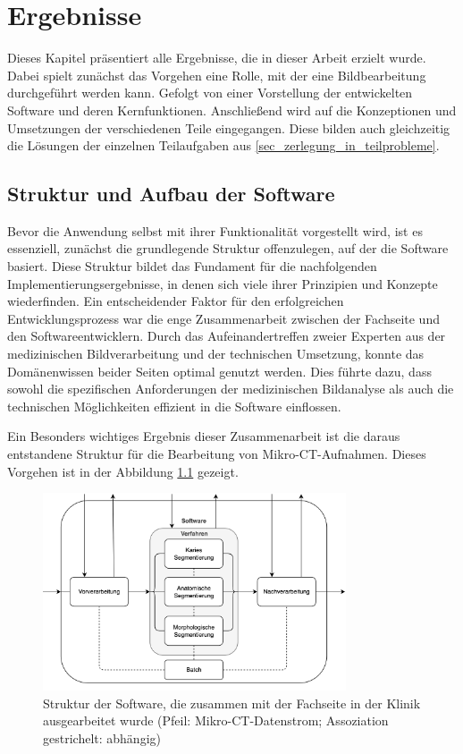 \chapter{Ergebnisse}
\label{chap:ergebnisse} Dieses Kapitel präsentiert alle Ergebnisse, die in
dieser Arbeit erzielt wurde. Dabei spielt zunächst das Vorgehen eine Rolle, mit
der eine Bildbearbeitung durchgeführt werden kann. Gefolgt von einer Vorstellung
der entwickelten Software und deren Kernfunktionen. Anschließend wird auf die
Konzeptionen und Umsetzungen der verschiedenen Teile eingegangen. Diese bilden auch
gleichzeitig die Lösungen der einzelnen Teilaufgaben aus \ref{sec_zerlegung_in_teilprobleme}.

\section{Struktur und Aufbau der Software}
\label{sec:struktur_der_software} Bevor die Anwendung selbst mit ihrer Funktionalität
vorgestellt wird, ist es essenziell, zunächst die grundlegende Struktur offenzulegen,
auf der die Software basiert. Diese Struktur bildet das Fundament für die nachfolgenden
Implementierungsergebnisse, in denen sich viele ihrer Prinzipien und Konzepte
wiederfinden. Ein entscheidender Faktor für den erfolgreichen Entwicklungsprozess
war die enge Zusammenarbeit zwischen der Fachseite und den Softwareentwicklern.
Durch das Aufeinandertreffen zweier Experten aus der medizinischen
Bildverarbeitung und der technischen Umsetzung, konnte das Domänenwissen beider Seiten
optimal genutzt werden. Dies führte dazu, dass sowohl die spezifischen Anforderungen
der medizinischen Bildanalyse als auch die technischen Möglichkeiten effizient in
die Software einflossen.

Ein Besonders wichtiges Ergebnis dieser Zusammenarbeit ist die daraus entstandene
Struktur für die Bearbeitung von Mikro-\ac{CT}-Aufnahmen. Dieses Vorgehen ist in
der Abbildung \ref{fig:struktur_der_software} gezeigt.

\begin{figure}[h]
	\centering
	\includegraphics[width=0.8\textwidth]{img/struktur_der_software.png}
	\caption{Struktur der Software, die zusammen mit der Fachseite in der Klinik ausgearbeitet
	wurde (Pfeil: Mikro-CT-Datenstrom; Assoziation gestrichelt: abhängig)}
	\label{fig:struktur_der_software}
\end{figure}


